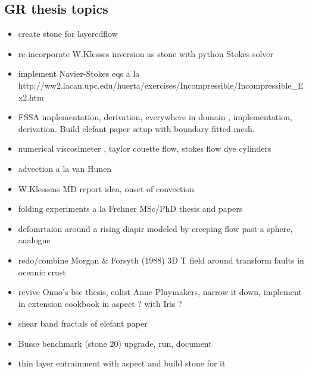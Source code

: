 \subsection{GR thesis topics}
\begin{itemize} 
\item create stone for layeredflow 
\item re-incorporate W.Klesses inversion as stone with python Stokes solver
\item implement Navier-Stokes eqs a la http://ww2.lacan.upc.edu/huerta/exercises/Incompressible/Incompressible\_Ex2.htm
\item FSSA implementation, derivation, everywhere in domain \cite{sctc20}, implementation, derivation. Build elefant paper
      setup with boundary fitted mesh.
\item numerical viscosimeter \cite{batt84}, taylor couette flow, stokes flow dye cylinders
\item advection a la van Hunen
\item W.Klessens MD report idea, onset of convection
\item folding experiments a la Frehner MSc/PhD thesis and papers 
\item defomrtaion around a rising diapir modeled by creeping flow past a sphere, analogue \cite{crud88}
\item redo/combine Morgan \& Forsyth (1988) \cite{mofo88} 3D T field around transform faults in oceanic crust
\item revive Onno's bsc thesis, enlist Anne Pluymakers, narrow it down, implement in extension 
      cookbook in aspect ? with Iris ?
\item shear band fractals of elefant paper
\item Busse benchmark (stone 20) upgrade, run, document
\item thin layer entrainment with aspect and build stone for it 
\end{itemize}

